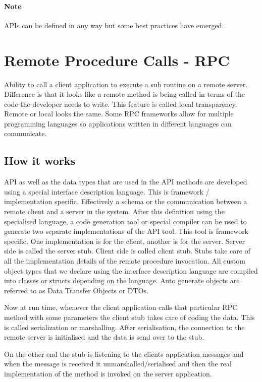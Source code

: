 \documentclass[a4paper, 11pt]{book}
\begin{document}
    \paragraph{Note}
    APIs can be defined in any way but some best practices have emerged.


    \section{Remote Procedure Calls - RPC}
    Ability to call a client application to execute a sub routine on a remote server.
    Difference is that it looks like a remote method is being called in terms of the code the developer needs to write.
    This feature is called local transparency.
    Remote or local looks the same.
    Some RPC frameworks allow for multiple programming languages so applications written in different languages can communicate.

    \subsection{How it works}
    API as well as the data types that are used in the API methods are developed using a special interface description language.
    This is framework / implementation specific.
    Effectively a schema or the communication between a remote client and a server in the system.
    After this definition using the specialised language, a code generation tool or special compiler can be used to generate two separate implementations of the API tool.
    This tool is framework specific.
    One implementation is for the client, another is for the server.
    Server side is called the server stub.
    Client side is called client stub.
    Stubs take care of all the implementation details of the remote procedure invocation.
    All custom object types that we declare using the interface description language are compiled into classes or structs depending on the language.
    Auto generate objects are referred to as Data Transfer Objects or DTOs.

    Now at run time, whenever the client application calls that particular RPC method with some parameters the client stub takes care of coding the data.
    This is called serialization or marshalling.
    After serialisation, the connection to the remote server is initialised and the data is send over to the stub.

    On the other end the stub is listening to the clients application messages and when the message is received it
    unmarshalled/serialised and then the real implementation of the method is invoked on the server application.
\end{document}

